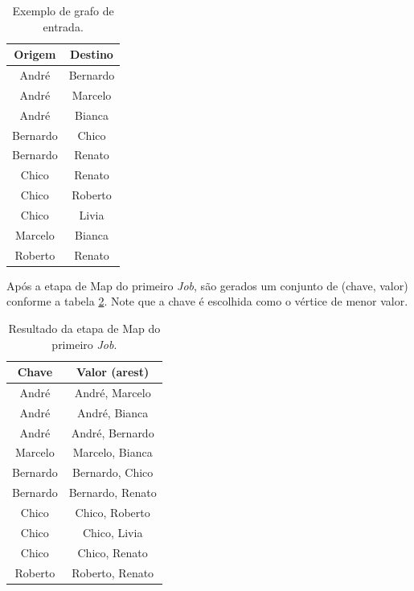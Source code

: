 \begin{table}[]
\centering
\caption{Exemplo de grafo de entrada.}
\label{grafoExemplo}
\begin{tabular}{cc}
\hline
{\bf Origem} & {\bf Destino} \\ \hline
André        & Bernardo      \\ \hline
André        & Marcelo       \\ \hline
André        & Bianca        \\ \hline
Bernardo     & Chico         \\ \hline
Bernardo     & Renato        \\ \hline
Chico        & Renato        \\ \hline
Chico        & Roberto       \\ \hline
Chico        & Livia         \\ \hline
Marcelo      & Bianca        \\ \hline
Roberto      & Renato        \\ \hline      
\end{tabular}
\end{table}

Após a etapa de Map do primeiro \textit{Job}, são gerados um conjunto de (chave, valor) conforme a tabela \ref{map1}. Note que a chave é escolhida como o vértice de menor valor.

\begin{table}[]
\centering
\caption{Resultado da etapa de Map do primeiro \textit{Job}.}
\label{map1}
\begin{tabular}{cc}

\hline
{\bf Chave} & {\bf Valor (arest)}      \\ \hline
André       & André, Marcelo   \\ \hline
André       & André, Bianca    \\ \hline
André       & André, Bernardo  \\ \hline
Marcelo     & Marcelo, Bianca  \\ \hline
Bernardo    & Bernardo, Chico  \\ \hline
Bernardo    & Bernardo, Renato \\ \hline
Chico       & Chico, Roberto   \\ \hline
Chico       & Chico, Livia     \\ \hline
Chico       & Chico, Renato    \\ \hline
Roberto     & Roberto, Renato  \\ \hline     
\end{tabular}
\end{table}

